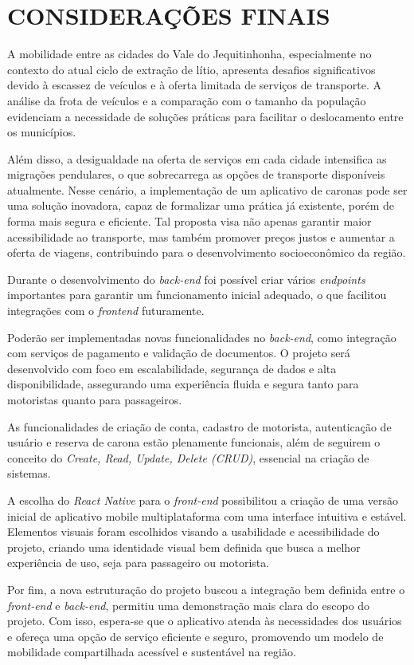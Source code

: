 \chapter{CONSIDERAÇÕES FINAIS}

A mobilidade entre as cidades do Vale do Jequitinhonha, especialmente no contexto do atual ciclo de extração de lítio, apresenta desafios significativos devido à escassez de veículos e à oferta limitada de serviços de transporte. A análise da frota de veículos e a comparação com o tamanho da população evidenciam a necessidade de soluções práticas para facilitar o deslocamento entre os municípios.

Além disso, a desigualdade na oferta de serviços em cada cidade intensifica as migrações pendulares, o que sobrecarrega as opções de transporte disponíveis atualmente. Nesse cenário, a implementação de um aplicativo de caronas pode ser uma solução inovadora, capaz de formalizar uma prática já existente, porém de forma mais segura e eficiente. Tal proposta visa não apenas garantir maior acessibilidade ao transporte, mas também promover preços justos e aumentar a oferta de viagens, contribuindo para o desenvolvimento socioeconômico da região.

Durante o desenvolvimento do \textit{back-end} foi possível criar vários \textit{endpoints} importantes para garantir um funcionamento inicial adequado, o que facilitou integrações com o \textit{frontend} futuramente. 

Poderão ser implementadas novas funcionalidades no \textit{back-end}, como integração com serviços de pagamento e validação de documentos. O projeto será desenvolvido com foco em escalabilidade, segurança de dados e alta disponibilidade, assegurando uma experiência fluida e segura tanto para motoristas quanto para passageiros.

As funcionalidades de criação de conta, cadastro de motorista, autenticação de usuário e reserva de carona estão plenamente funcionais, além de seguirem o conceito do \textit{Create, Read, Update, Delete (CRUD)}, essencial na criação de sistemas. 

A escolha do \textit{React Native} para o \textit{front-end} possibilitou a criação de uma versão inicial de aplicativo mobile multiplataforma com uma interface intuitiva e estável. Elementos visuais foram escolhidos visando a usabilidade e acessibilidade do projeto, criando uma identidade visual bem definida que busca a melhor experiência de uso, seja para passageiro ou motorista.

Por fim, a nova estruturação do projeto buscou a integração bem definida entre o \textit{front-end} e \textit{back-end}, permitiu uma demonstração mais clara do escopo do projeto. Com isso, espera-se que o aplicativo atenda às necessidades dos usuários e ofereça uma opção de serviço eficiente e seguro, promovendo um modelo de mobilidade compartilhada acessível e sustentável na região.
